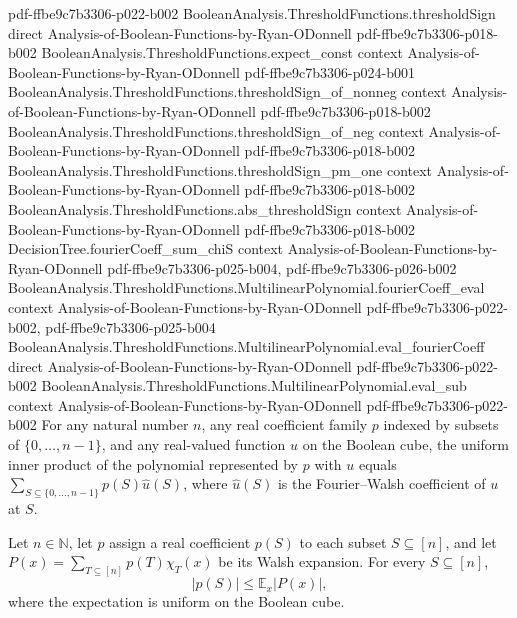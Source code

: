\begin{lemma}
  {pdf-ffbe9c7b3306-p022-b002}
\proofstep
  {BooleanAnalysis.ThresholdFunctions.thresholdSign}
  {direct}
  {Analysis-of-Boolean-Functions-by-Ryan-ODonnell}
  {pdf-ffbe9c7b3306-p018-b002}
\proofstep
  {BooleanAnalysis.ThresholdFunctions.expect_const}
  {context}
  {Analysis-of-Boolean-Functions-by-Ryan-ODonnell}
  {pdf-ffbe9c7b3306-p024-b001}
\proofstep
  {BooleanAnalysis.ThresholdFunctions.thresholdSign_of_nonneg}
  {context}
  {Analysis-of-Boolean-Functions-by-Ryan-ODonnell}
  {pdf-ffbe9c7b3306-p018-b002}
\proofstep
  {BooleanAnalysis.ThresholdFunctions.thresholdSign_of_neg}
  {context}
  {Analysis-of-Boolean-Functions-by-Ryan-ODonnell}
  {pdf-ffbe9c7b3306-p018-b002}
\proofstep
  {BooleanAnalysis.ThresholdFunctions.thresholdSign_pm_one}
  {context}
  {Analysis-of-Boolean-Functions-by-Ryan-ODonnell}
  {pdf-ffbe9c7b3306-p018-b002}
\proofstep
  {BooleanAnalysis.ThresholdFunctions.abs_thresholdSign}
  {context}
  {Analysis-of-Boolean-Functions-by-Ryan-ODonnell}
  {pdf-ffbe9c7b3306-p018-b002}
\proofstep
  {DecisionTree.fourierCoeff_sum_chiS}
  {context}
  {Analysis-of-Boolean-Functions-by-Ryan-ODonnell}
  {pdf-ffbe9c7b3306-p025-b004,
    pdf-ffbe9c7b3306-p026-b002}
\proofstep
  {BooleanAnalysis.ThresholdFunctions.MultilinearPolynomial.fourierCoeff_eval}
  {context}
  {Analysis-of-Boolean-Functions-by-Ryan-ODonnell}
  {pdf-ffbe9c7b3306-p022-b002,
    pdf-ffbe9c7b3306-p025-b004}
\proofstep
  {BooleanAnalysis.ThresholdFunctions.MultilinearPolynomial.eval_fourierCoeff}
  {direct}
  {Analysis-of-Boolean-Functions-by-Ryan-ODonnell}
  {pdf-ffbe9c7b3306-p022-b002}
\proofstep
  {BooleanAnalysis.ThresholdFunctions.MultilinearPolynomial.eval_sub}
  {context}
  {Analysis-of-Boolean-Functions-by-Ryan-ODonnell}
  {pdf-ffbe9c7b3306-p022-b002}
For any natural number $n$, any real coefficient family $p$ indexed by subsets of
$\{0,\ldots,n-1\}$, and any real-valued function $u$ on the Boolean cube, the uniform
inner product of the polynomial represented by $p$ with $u$ equals
$\sum_{S\subseteq\{0,\ldots,n-1\}}p(S)\widehat u(S)$, where $\widehat u(S)$ is the
Fourier--Walsh coefficient of $u$ at $S$.
\end{lemma}

\begin{lemma}
\leanok
{}
Let $n\in\mathbb N$, let $p$ assign a real coefficient $p(S)$ to each subset
$S\subseteq[n]$, and let $P(x)=\sum_{T\subseteq[n]}p(T)\chi_T(x)$ be its Walsh
expansion. For every $S\subseteq[n]$, \[|p(S)|\le\mathbb E_x|P(x)|,\] where the
expectation is uniform on the Boolean cube.
\end{lemma}

